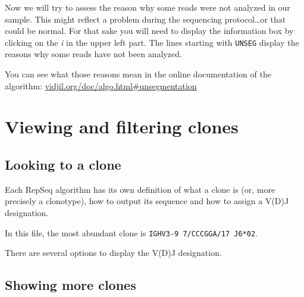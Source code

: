 \documentclass[10pt]{article}
\begin{document}
Now we will try to assess the reason why some reads were not analyzed in our
sample.
This might reflect a problem during the sequencing protocol\dots or that could
be normal.
For that sake you will need to display the information box by clicking on the
\textit{i} in the upper left part.
The lines starting with \texttt{UNSEG} display the reasons why some reads have
not been analyzed.

You can see what those reasons mean in the online documentation of the
algorithm: \href{http://www.vidjil.org/doc/algo.html\#unsegmentation}{vidjil.org/doc/algo.html\#unsegmentation
}

\section{Viewing and filtering clones}


\subsection{Looking to a clone}

Each RepSeq algorithm has its own definition of what a clone is (or, more precisely
a clonotype), how to output its sequence and how to assign a V(D)J designation.

In this file, the most abundant clone
is \texttt{IGHV3-9 7/CCCGGA/17 J6*02}.


There are several options to display the V(D)J designation.

  

\subsection{Showing more clones}
\end{document}
